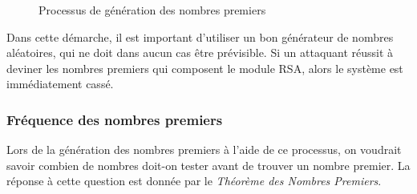 		\begin{figure}[H]
			\begin{center}
			\end{center}
			\caption{Processus de génération des nombres premiers}\label{fig:M1}
		\end{figure}
		Dans cette démarche, il est important d'utiliser un bon générateur de nombres aléatoires, qui ne doit dans aucun cas être prévisible. Si un attaquant réussit à deviner les nombres premiers qui composent le module RSA, alors le système est immédiatement cassé.
	
		\subsubsection*{Fréquence des nombres premiers}
		Lors de la génération des nombres premiers à l'aide de ce processus, on voudrait savoir combien de nombres doit-on tester avant de trouver un nombre premier. La réponse à cette question est donnée par le \textit{Théorème des Nombres Premiers}.
		
	
